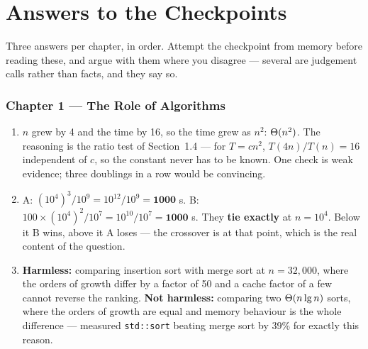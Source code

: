 \chapter{Answers to the Checkpoints}\label{app:answers}
\normalfigures

Three answers per chapter, in order. Attempt the checkpoint from memory before
reading these, and argue with them where you disagree --- several are judgement
calls rather than facts, and they say so.

\newcommand{\ansch}[1]{\subsection*{\color{primary}Chapter #1}}
\newenvironment{ans}
  {\begin{enumerate}[leftmargin=*, itemsep=4pt, topsep=3pt,
                     label=\textbf{\arabic*.}]}
  {\end{enumerate}}

\ansch{1 --- The Role of Algorithms}
\begin{ans}
  \item $n$ grew by 4 and the time by 16, so the time grew as $n^{2}$:
        $\Theta(n^{2})$. The reasoning is the ratio test of Section~1.4 --- for
        $T = cn^{2}$, $T(4n)/T(n) = 16$ independent of $c$, so the constant
        never has to be known. One check is weak evidence; three doublings in
        a row would be convincing.
  \item A: $(10^{4})^{3}/10^{9} = 10^{12}/10^{9} = \mathbf{1000}$ s. B:
        $100 \times (10^{4})^{2}/10^{7} = 10^{10}/10^{7} = \mathbf{1000}$ s.
        They \textbf{tie exactly} at $n = 10^{4}$. Below it B wins, above it A
        loses --- the crossover is at that point, which is the real content of
        the question.
  \item \textbf{Harmless:} comparing insertion sort with merge sort at
        $n = 32{,}000$, where the orders of growth differ by a factor of 50 and
        a cache factor of a few cannot reverse the ranking.
        \textbf{Not harmless:} comparing two $\Theta(n\operatorname{lg} n)$ sorts, where the
        orders of growth are equal and memory behaviour is the whole
        difference ---  measured \texttt{std::sort} beating
        merge sort by 39\% for exactly this reason.
\end{ans}

